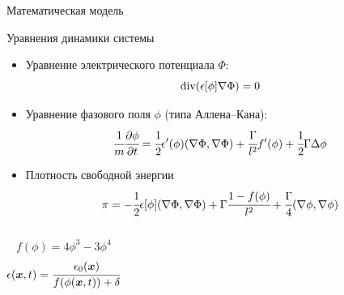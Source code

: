 \begin{frame}{Математическая модель}
\vspace{-0.3cm}
\begin{block}{Уравнения динамики системы}
	\begin{itemize}
		\item Уравнение электрического потенциала $\Phi$:
		\[
			\operatorname{{div}}(\epsilon[\phi] \nabla \Phi) = 0
		\]
		\item Уравнение фазового поля $\phi$ (типа Аллена--Кана):
		\[
			\cfrac{1}{m} \cfrac{\partial \phi}{\partial t} = \cfrac{1}{2} \epsilon'(\phi) (\nabla \Phi, \nabla \Phi) + \cfrac{\Gamma}{l^2} f'(\phi) + \cfrac{1}{2} \Gamma \Delta \phi
		\]
	\end{itemize}
\end{block}
\begin{itemize}
	\item Плотность свободной энергии
	\vspace{-0.2cm}
	\[
		\pi = -\cfrac{1}{2} \epsilon[\phi] (\nabla \Phi, \nabla \Phi) + \Gamma \cfrac{1 - f(\phi)}{l^2} + \cfrac{\Gamma}{4} (\nabla \phi, \nabla \phi)
	\]
\end{itemize}
\vspace{-0.6cm}
\begin{columns}
	\vspace{0.35cm}
	\[
		f(\phi) = 4 \phi^3 - 3 \phi^4
	\]
	\[
		\epsilon({\boldsymbol{x}}, t) = \cfrac{\epsilon_0({\boldsymbol{x}})}{f(\phi({\boldsymbol{x}}, t)) + \delta}
	\]
\end{columns}
\end{frame}

